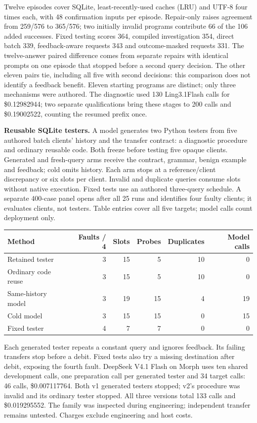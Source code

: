 \documentclass[11pt]{article}
\begin{document}
Twelve episodes cover SQLite, least-recently-used caches (LRU) and UTF-8
four times each, with 48 confirmation inputs per episode. Repair-only raises
agreement from 259/576 to 365/576; two initially invalid programs contribute
66 of the 106 added successes. Fixed testing scores 364, compiled investigation
354, direct batch 339, feedback-aware requests 343 and outcome-masked requests
331. The twelve-answer paired difference comes from separate repairs with
identical prompts on one episode that stopped before a second query decision.
The other eleven pairs tie, including all five with second decisions: this
comparison does not identify a feedback benefit. Eleven starting programs are distinct; only three mechanisms were authored. The diagnostic used 130
Ling3.1Flash calls for \$0.12982944; two separate qualifications bring these
stages to 200 calls and \$0.19002522, counting the resumed prefix once.

\textbf{Reusable SQLite testers.}
A model generates two Python testers from five authored batch clients'
history and the transfer contract: a diagnostic procedure and ordinary reusable
code. Both freeze before testing five opaque clients. Generated and fresh-query
arms receive the contract, grammar, benign example and feedback; cold omits
history. Each arm stops at a reference/client discrepancy or six slots per client.
Invalid and duplicate queries consume slots without native execution.
Fixed tests use an authored three-query schedule. A separate 400-case panel opens
after all 25 runs and identifies four faulty clients; it evaluates clients, not
testers. Table entries cover all five targets; model calls count deployment only.
\begin{center}\small
\begin{tabular}{lrrrrr}
\toprule
Method & Faults / 4 & Slots & Probes & Duplicates & Model calls\\
\midrule
Retained tester & 3 & 15 & 5 & 10 & 0\\
Ordinary code reuse & 3 & 15 & 5 & 10 & 0\\
Same-history model & 3 & 19 & 15 & 4 & 19\\
Cold model & 3 & 15 & 15 & 0 & 15\\
Fixed tester & 4 & 7 & 7 & 0 & 0\\
\bottomrule
\end{tabular}
\end{center}
Each generated tester repeats a constant query and ignores feedback. Its failing
transfers stop before a debit. Fixed tests also try a missing destination after
debit, exposing the fourth fault. DeepSeek V4.1 Flash on Morph uses ten shared
development calls, one preparation call per generated tester and 34 target calls:
46 calls, \$0.007117764. Both v1 generated testers stopped; v2's procedure was
invalid and its ordinary tester stopped. All three
versions total 133 calls and \$0.019295552. The family was inspected during
engineering; independent transfer remains untested. Charges exclude engineering and host costs.
\end{document}
